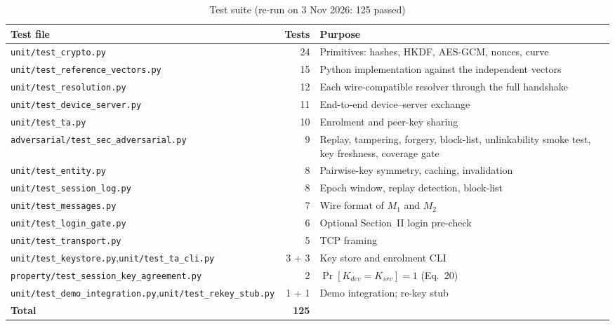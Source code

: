 \begin{table}[H]
\centering
\caption{Test suite (re-run on 3 Nov 2026: 125 passed)}
\label{tab:tests}
\footnotesize
\renewcommand{\arraystretch}{1.1}
\begin{tabularx}{\textwidth}{|>{\raggedright\arraybackslash}p{}|r|>{\raggedright\arraybackslash}X|}
\hline
\textbf{Test file} & \textbf{Tests} & \textbf{Purpose}\\ \hline
\texttt{unit/test\_crypto.py} & 24 & Primitives: hashes, HKDF, AES-GCM, nonces, curve\\ \hline
\texttt{unit/test\_reference\_vectors.py} & 15 & Python implementation against the independent vectors\\ \hline
\texttt{unit/test\_resolution.py} & 12 & Each wire-compatible resolver through the full handshake\\ \hline
\texttt{unit/test\_device\_server.py} & 11 & End-to-end device--server exchange\\ \hline
\texttt{unit/test\_ta.py} & 10 & Enrolment and peer-key sharing\\ \hline
\texttt{adversarial/test\_sec\_}\newline\texttt{adversarial.py} & 9 & Replay, tampering, forgery, block-list, unlinkability smoke test, key freshness, coverage gate\\ \hline
\texttt{unit/test\_entity.py} & 8 & Pairwise-key symmetry, caching, invalidation\\ \hline
\texttt{unit/test\_session\_log.py} & 8 & Epoch window, replay detection, block-list\\ \hline
\texttt{unit/test\_messages.py} & 7 & Wire format of $M_1$ and $M_2$\\ \hline
\texttt{unit/test\_login\_gate.py} & 6 & Optional Section~II login pre-check\\ \hline
\texttt{unit/test\_transport.py} & 5 & TCP framing\\ \hline
\texttt{unit/test\_keystore.py},\newline \texttt{unit/test\_ta\_cli.py} & 3 + 3 & Key store and enrolment CLI\\ \hline
\texttt{property/test\_session\_key\_}\newline\texttt{agreement.py} & 2 & $\Pr[K_{dev}=K_{srv}]=1$ (Eq.~20)\\ \hline
\texttt{unit/test\_demo\_integration.py},\newline \texttt{unit/test\_rekey\_stub.py} & 1 + 1 & Demo integration; re-key stub\\ \hline
\textbf{Total} & \textbf{125} & \\ \hline
\end{tabularx}
\end{table}

